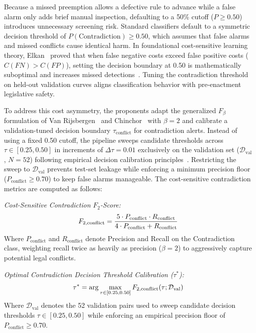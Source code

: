     Because a missed preemption allows a defective rule to advance while a false alarm only adds brief manual inspection, defaulting to a 50\% cutoff ($P \ge 0.50$) introduces unnecessary screening risk. Standard classifiers default to a symmetric decision threshold of $P(\text{Contradiction}) \ge 0.50$, which assumes that false alarms and missed conflicts cause identical harm. In foundational cost-sensitive learning theory, Elkan~\cite{elkan2001foundations} proved that when false negative costs exceed false positive costs ($C(FN) > C(FP)$), setting the decision boundary at 0.50 is mathematically suboptimal and increases missed detections~\cite{fawcett2006roc}. Tuning the contradiction threshold on held-out validation curves aligns classification behavior with pre-enactment legislative safety.

    To address this cost asymmetry, the proponents adapt the generalized $F_\beta$ formulation of Van Rijsbergen~\cite{vanrijsbergen1979information} and Chinchor~\cite{chinchor1992muc4} with $\beta = 2$ and calibrate a validation-tuned decision boundary $\tau_{\text{conflict}}$ for contradiction alerts. Instead of using a fixed 0.50 cutoff, the pipeline sweeps candidate thresholds across $\tau \in [0.25, 0.50]$ in increments of $\Delta \tau = 0.01$ exclusively on the validation set ($\mathcal{D}_{\text{val}}$, $N = 52$) following empirical decision calibration principles~\cite{fawcett2006roc}. Restricting the sweep to $\mathcal{D}_{\text{val}}$ prevents test-set leakage while enforcing a minimum precision floor ($P_{\text{conflict}} \ge 0.70$) to keep false alarms manageable. The cost-sensitive contradiction metrics are computed as follows:

    \noindent\textit{Cost-Sensitive Contradiction $F_2$-Score:}
    \begin{equation}
        F_{2, \text{conflict}} = \frac{5 \cdot P_{\text{conflict}} \cdot R_{\text{conflict}}}{4 \cdot P_{\text{conflict}} + R_{\text{conflict}}}
        \label{eq:f2_conflict}
        \eqcaption{Cost-Sensitive Contradiction $F_2$-Score}
    \end{equation}
    \noindent Where $P_{\text{conflict}}$ and $R_{\text{conflict}}$ denote Precision and Recall on the Contradiction class, weighting recall twice as heavily as precision ($\beta = 2$) to aggressively capture potential legal conflicts.

    \noindent\textit{Optimal Contradiction Decision Threshold Calibration ($\tau^*$):}
    \begin{equation}
        \tau^* = \arg\max_{\tau \in [0.25, 0.50]} F_{2, \text{conflict}}(\tau; \mathcal{D}_{\text{val}})
        \label{eq:optimal_threshold}
        \eqcaption{Optimal Contradiction Decision Threshold Calibration ($\tau^*$)}
    \end{equation}
    \noindent Where $\mathcal{D}_{\text{val}}$ denotes the 52 validation pairs used to sweep candidate decision thresholds $\tau \in [0.25, 0.50]$ while enforcing an empirical precision floor of $P_{\text{conflict}} \ge 0.70$.

